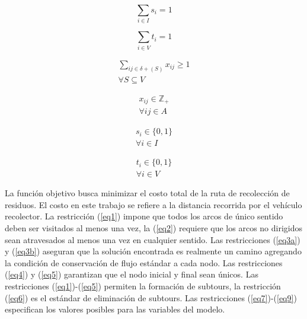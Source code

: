 \documentclass[spanish, conference]{IEEEtran}
\begin{document}
\begin{equation} \tag{4} \label{eq4}
\sum_{i \in I} s_i = 1 
\end{equation}
\hbox{}

\begin{equation} \tag{5} \label{eq5}
\sum_{i \in V} t_i = 1 
\end{equation}
\hbox{}

\begin{equation} \tag{6} \label{eq6}
\begin{gathered}
    \sum_{i j \in \delta + (S)} x_{i j} \geq 1 \\
    \forall S \subseteq V
\end{gathered}
\end{equation}
\hbox{}

\begin{equation} \tag{7} \label{eq7}
\begin{gathered}
    x_{i j} \in \mathbb{Z}_+ \\
    \forall i j \in A
\end{gathered}
\end{equation}
\hbox{}

\begin{equation} \tag{8} \label{eq8}
\begin{gathered}
    s_i \in \{0,1\} \\
    \forall i \in I
\end{gathered}
\end{equation}
\hbox{}

\begin{equation} \tag{9} \label{eq9}
\begin{gathered}
    t_i \in \{0,1\} \\
    \forall i \in V
\end{gathered}
\end{equation}

La función objetivo busca minimizar el costo total de la ruta de recolección de residuos. El costo en este trabajo se refiere a la distancia recorrida por el vehículo recolector. La restricción (\ref{eq1}) impone que todos los arcos de único sentido deben ser visitados al menos una vez, la (\ref{eq2}) requiere que los arcos no dirigidos sean atravesados al menos una vez en cualquier sentido. Las restricciones (\ref{eq3a}) y (\ref{eq3b}) aseguran que la solución encontrada es realmente un camino agregando la condición de conservación de flujo estándar a cada nodo. Las restricciones (\ref{eq4}) y (\ref{eq5}) garantizan que el nodo inicial y final sean únicos. Las restricciones (\ref{eq1})-(\ref{eq5}) permiten la formación de subtours, la restricción (\ref{eq6}) es el estándar de eliminación de subtours. Las restricciones (\ref{eq7})-(\ref{eq9}) especifican los valores posibles para las variables del modelo.
\end{document}
